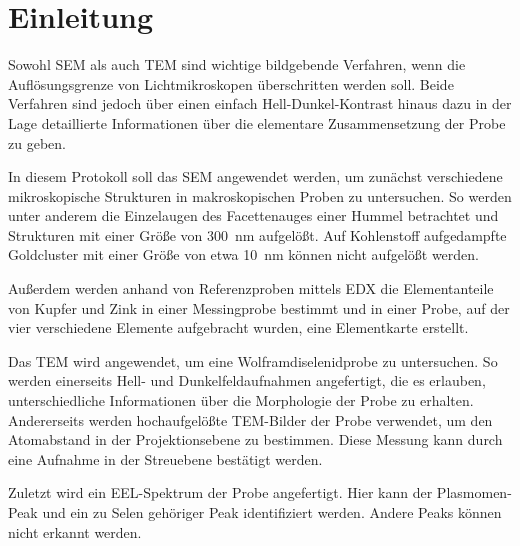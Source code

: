 \section{Einleitung}

	Sowohl SEM als auch TEM sind wichtige bildgebende Verfahren, wenn die Auflösungsgrenze von Lichtmikroskopen überschritten werden soll.
	Beide Verfahren sind jedoch über einen einfach Hell-Dunkel-Kontrast hinaus dazu in der Lage detaillierte Informationen über die elementare Zusammensetzung der Probe zu geben.

	In diesem Protokoll soll das SEM angewendet werden, um zunächst verschiedene mikroskopische Strukturen in makroskopischen Proben zu untersuchen.
	So werden unter anderem die Einzelaugen des Facettenauges einer Hummel betrachtet und Strukturen mit einer Größe von \SI{300}{nm} aufgelößt.
	Auf Kohlenstoff aufgedampfte Goldcluster mit einer Größe von etwa \SI{10}{nm} können nicht aufgelößt werden.

	Außerdem werden anhand von Referenzproben mittels EDX die Elementanteile von Kupfer und Zink in einer Messingprobe bestimmt und in einer Probe, auf der vier verschiedene Elemente aufgebracht wurden, eine Elementkarte erstellt.
	\par
	Das TEM wird angewendet, um eine Wolframdiselenidprobe zu untersuchen.
	So werden einerseits Hell- und Dunkelfeldaufnahmen angefertigt, die es erlauben, unterschiedliche Informationen über die Morphologie der Probe zu erhalten.
	Andererseits werden hochaufgelößte TEM-Bilder der Probe verwendet, um den Atomabstand in der Projektionsebene zu bestimmen.
	Diese Messung kann durch eine Aufnahme in der Streuebene bestätigt werden.

	Zuletzt wird ein EEL-Spektrum der Probe angefertigt.
	Hier kann der Plasmomen-Peak und ein zu Selen gehöriger Peak identifiziert werden.
	Andere Peaks können nicht erkannt werden.
